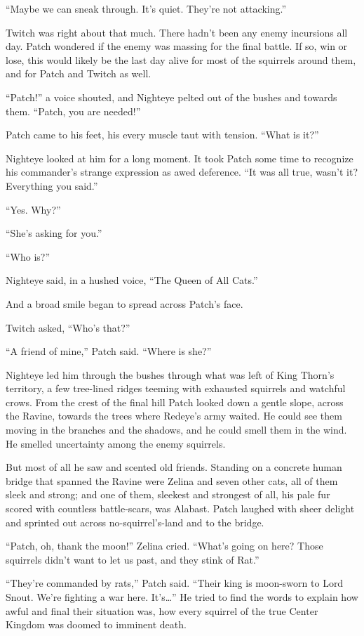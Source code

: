 \documentclass[ebook,oneside,openany,17pt]{memoir}
\begin{document}
“Maybe we can sneak through. It’s quiet. They’re not attacking.”

Twitch was right about that much. There hadn’t been any enemy
incursions all day. Patch wondered if the enemy was massing for the
final battle. If so, win or lose, this would likely be the last day
alive for most of the squirrels around them, and for Patch and Twitch
as well.

“Patch!” a voice shouted, and Nighteye pelted out of the bushes and
towards them. “Patch, you are needed!”

Patch came to his feet, his every muscle taut with tension. “What is
it?”

Nighteye looked at him for a long moment. It took Patch some time to
recognize his commander’s strange expression as awed deference. “It
was all true, wasn’t it? Everything you said.”

“Yes. Why?”

“She’s asking for you.”

“Who is?”

Nighteye said, in a hushed voice, “The Queen of All Cats.”

And a broad smile began to spread across Patch’s face.

Twitch asked, “Who’s that?”

“A friend of mine,” Patch said. “Where is she?”

Nighteye led him through the bushes through what was left of King
Thorn’s territory, a few tree-lined ridges teeming with exhausted
squirrels and watchful crows. From the crest of the final hill Patch
looked down a gentle slope, across the Ravine, towards the trees where
Redeye’s army waited. He could see them moving in the branches and the
shadows, and he could smell them in the wind. He smelled uncertainty
among the enemy squirrels.

But most of all he saw and scented old friends. Standing on a concrete
human bridge that spanned the Ravine were Zelina and seven other cats,
all of them sleek and strong; and one of them, sleekest and strongest
of all, his pale fur scored with countless battle-scars, was
Alabast. Patch laughed with sheer delight and sprinted out across
no-squirrel’s-land and to the bridge.

“Patch, oh, thank the moon!” Zelina cried. “What’s going on here?
Those squirrels didn’t want to let us past, and they stink of Rat.”

“They’re commanded by rats,” Patch said. “Their king is moon-sworn to
Lord Snout. We’re fighting a war here. It’s…” He tried to find the
words to explain how awful and final their situation was, how every
squirrel of the true Center Kingdom was doomed to imminent death.
\end{document}
